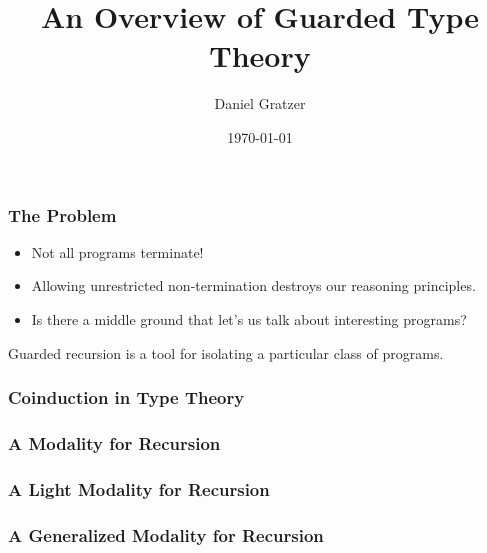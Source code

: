 \documentclass[usenames,dvipsnames,aspectratio=169,12pt]{beamer}
\title{An Overview of Guarded Type Theory}
\author{Daniel Gratzer}
\date{\today}
\begin{document}
\begin{frame}[noframenumbering]
  \titlepage
\end{frame}

\begin{frame}
  \frametitle{The Problem}
  \begin{itemize}
  \item Not all programs terminate!
  \item Allowing unrestricted non-termination destroys our reasoning principles.
  \item Is there a middle ground that let's us talk about interesting programs?
  \end{itemize}

  \pause
  \bigskip

  Guarded recursion is a tool for isolating a particular class of programs.
\end{frame}

\begin{frame}
  \frametitle{Coinduction in Type Theory}
\end{frame}


\begin{frame}
  \frametitle{A Modality for Recursion}
\end{frame}

\begin{frame}
  \frametitle{A Light Modality for Recursion}
\end{frame}

\begin{frame}
  \frametitle{A Generalized Modality for Recursion}
\end{frame}
\end{document}
